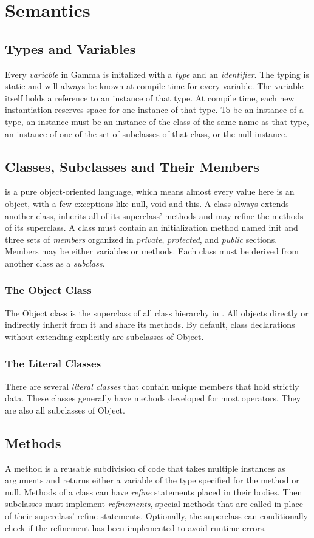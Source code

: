 \section{Semantics}
\subsection{Types and Variables}
Every \textit{variable} in Gamma is initalized with a \textit{type} and an \textit{identifier}. The typing is static and will always be known at compile time for every variable. The variable itself holds a reference to an instance of that type. At compile time, each new instantiation reserves space for one instance of that type. To be an instance of a type, an instance must be an instance of the class of the same name as that type, an instance of one of the set of subclasses of that class, or the null instance.
\subsection{Classes, Subclasses and Their Members}
\Lang{} is a pure object-oriented language, which means almost every value here is an object, with a few exceptions like null, void and this. A class always extends another class, inherits all of its superclass' methods and may refine the methods of its superclass. A class must contain an initialization method named init and three sets of \textit{members} organized in \textit{private}, \textit{protected}, and \textit{public} sections. Members may be either variables or methods. Each class must be derived from another class as a \textit{subclass}.

\subsubsection{The Object Class}
The Object class is the superclass of all class hierarchy in \Lang{}. All objects directly or indirectly inherit from it and share its methods. By default, class declarations without extending explicitly are subclasses of Object.

\subsubsection{The Literal Classes}
There are several \textit{literal classes} that contain unique members that hold strictly data. These classes generally have methods developed for most operators. They are also all subclasses of Object.

\subsection{Methods}
A method is a reusable subdivision of code that takes multiple instances as arguments and returns either a variable of the type specified for the method or null. Methods of a class can have \textit{refine} statements placed in their bodies. Then subclasses must implement \textit{refinements}, special methods that are called in place of their superclass' refine statements. Optionally, the superclass can conditionally check if the refinement has been implemented to avoid runtime errors.

